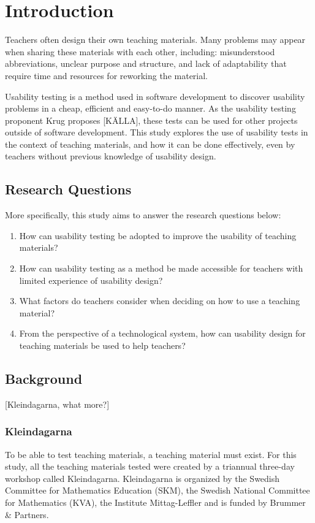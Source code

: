 \chapter{Introduction}

Teachers often design their own teaching materials. Many problems may appear when sharing these materials with each other, including: misunderstood abbreviations, unclear purpose and structure, and lack of adaptability that require time and resources for reworking the material.

Usability testing is a method used in software development to discover usability problems in a cheap, efficient and easy-to-do manner. As the usability testing proponent Krug proposes [KÄLLA], these tests can be used for other projects outside of software development. This study explores the use of usability tests in the context of teaching materials, and how it can be done effectively, even by teachers without previous knowledge of usability design.

\section{Research Questions}
More specifically, this study aims to answer the research questions below:

\begin{enumerate}
	\item How can usability testing be adopted to improve the usability of teaching materials?
	\item How can usability testing as a method be made accessible for teachers with limited experience of usability design?
	\item What factors do teachers consider when deciding on how to use a teaching material?
	\item From the perspective of a technological system, how can usability design for teaching materials be used to help teachers?
\end{enumerate}

\section{Background}
[Kleindagarna, what more?]

\subsection{Kleindagarna}
To be able to test teaching materials, a teaching material must exist. For this study, all the teaching materials tested were created by a triannual three-day workshop called Kleindagarna. Kleindagarna is organized by the Swedish Committee for Mathematics Education (SKM), the Swedish National Committee for Mathematics (KVA), the Institute Mittag-Leffler and is funded by Brummer \& Partners.

